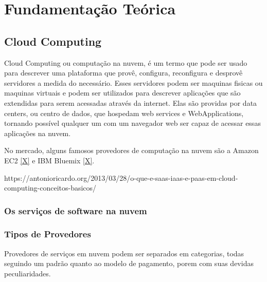\chapter{Fundamentação Teórica}
\section{Cloud Computing}
	Cloud Computing ou computação na nuvem, é um termo que pode ser usado para descrever uma plataforma que provê, configura, reconfigura e desprovê servidores a medida do necessário. Esses servidores podem ser maquinas fisicas ou maquinas virtuais e podem  ser utilizados para descrever aplicações que são extendidas para serem acessadas através da internet. Elas são providas por data centers, ou centro de dados, que hospedam web services e WebApplications, tornando possível qualquer um com um navegador web ser capaz de acessar essas aplicações na nuvem.
	
	No mercado, alguns famosos provedores de computação na nuvem são a Amazon EC2 \ref{X} e IBM Bluemix \ref{X}.
	
	https://antonioricardo.org/2013/03/28/o-que-e-saas-iaas-e-paas-em-cloud-computing-conceitos-basicos/

	\subsection{Os serviços de software na nuvem}

	\subsection{Tipos de Provedores} 
		Provedores de serviços em nuvem podem ser separados em categorias, todas seguindo um padrão quanto ao modelo de pagamento, porem com suas devidas peculiaridades.
	
